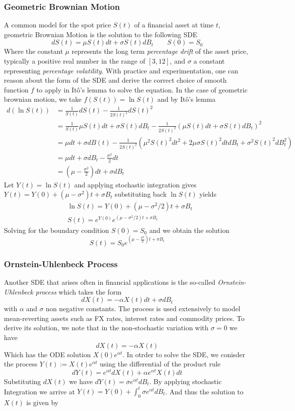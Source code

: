 \documentclass{article}
\begin{document}
\subsubsection{Geometric Brownian Motion}
A common model for the spot price $S(t)$ of a financial asset at time $t$, geometric Brownian Motion is the solution to the following SDE
$$dS(t) = \mu S(t)dt + \sigma S(t)dB_t \quad \quad S(0) = S_0$$
Where the constant $\mu$ represents the long term \textit{percentage drift} of the asset price, typically a positive real number in the range of $[3, 12]$, and $\sigma$ a constant representing \textit{percentage volatility}.  With practice and experimentation, one can reason about the form of the SDE and derive the correct choice of smooth function $f$ to apply in Itô's lemma to solve the equation. In the case of geometric brownian motion, we take $f(S(t)) = \ln S(t)$ and by Itô's lemma
\begin{align*}
    d(\ln S(t)) &= \frac{1}{S(t)}dS(t) - \frac{1}{2S(t)^2}dS(t)^2 \\
    &= \frac{1}{S(t)}\mu S(t)dt + \sigma S(t)dB_t - \frac{1}{2S(t)^2}(\mu S(t)dt + \sigma S(t)dB_t)^2 \\
    &= \mu dt + \sigma dB(t) - \frac{1}{2S(t)^2}(\mu^2S(t)^2dt^2 + 2\mu\sigma S(t)^2dtdB_t + \sigma^2 S(t)^2 dB_t^2)\\
    &= \mu dt + \sigma dB_t - \frac{\sigma^2}{2} dt \\
    &= \left(\mu - \frac{\sigma^2}{2}\right)dt + \sigma dB_t
\end{align*}
Let $Y(t) = \ln S(t)$ and applying stochastic integration gives $Y(t) = Y(0) + (\mu - \sigma^2)t + \sigma B_t$ substituting back $\ln S(t)$ yields 
\begin{align*}
    & \ln S(t) = Y(0) + (\mu - \sigma^2/2)t + \sigma B_t \\
    & S(t) = e^{Y(0)}e^{(\mu - \sigma^2/2)t + \sigma B_t}
\end{align*}
Solving for the boundary condition $S(0)=S_0$ and we obtain the solution
$$S(t) = S_0 e^{(\mu - \frac{\sigma^2}{2})t + \sigma B_t}$$

\subsubsection{Ornstein-Uhlenbeck Process}
Another SDE that arises often in financial applications is the so-called \textit{Ornstein-Uhlenbeck process} which takes the form
$$dX(t) = -\alpha X(t)dt + \sigma dB_t$$
with $\alpha$ and $\sigma$ non negative constants. The process is used extensively to model mean-reverting assets such as FX rates, interest rates and commodity prices. To derive its solution, we note that in the non-stochastic variation with $\sigma=0$ we have
$$dX(t) = -\alpha X(t)$$
Which has the ODE solution $X(0)e^{\alpha t}$. In otrder to solve the SDE, we conisder the process $Y(t) := X(t)e^{\alpha t}$ using the differential of the product rule
$$dY(t) = e^{\alpha t}dX(t) + \alpha e^{\alpha t}X(t)dt$$
Substituting $dX(t)$ we have $dY(t) = \sigma e^{\alpha t}dB_t$. By applying stochastic Integration we arrive at
$Y(t) = Y(0) + \int_{0}^{t}\sigma e^{\alpha t}dB_t$. And thus the solution to $X(t)$ is given by
\end{document}
